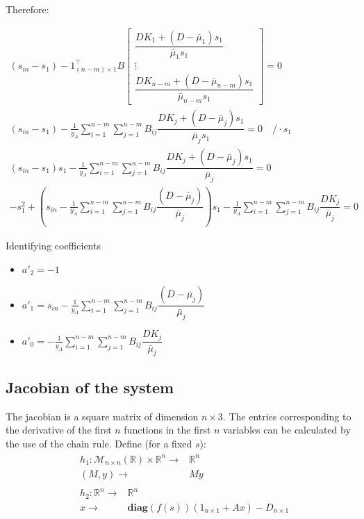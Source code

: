 \documentclass[3p,times]{elsarticle}
\newcommand{\R}{\mathbb{R}}
\newcommand{\diag}{\textbf{diag}}
\begin{document}
Therefore:

\begin{align}
(s_{in}-s_1)- 1_{(n-m)\times 1}^\top 
B\begin{bmatrix}
\dfrac{DK_1+(D-\bar{\mu}_1)s_1}{\bar{\mu}_{1}s_1} \\ \vdots \\ \dfrac{DK_{n-m}+(D-\bar{\mu}_{n-m})s_1}{\bar{\mu}_{n-m}s_1}
\end{bmatrix} = 0 \\
(s_{in}-s_1) -\frac{1}{y_A} \sum \limits_{i=1}^{n-m}\sum \limits_{j=1}^{n-m} B_{ij}\dfrac{DK_j+(D-\bar{\mu}_j)s_1}{\bar{\mu}_{j}s_1}  = 0 \quad /\cdot s_1 \\
(s_{in} - s_1)s_1   -\frac{1}{y_A} \sum \limits_{i=1}^{n-m}\sum \limits_{j=1}^{n-m} B_{ij}\dfrac{DK_j+(D-\bar{\mu}_j)s_1}{\bar{\mu}_{j}}  = 0 \\
-s_1^2 + \left( s_{in}-\frac{1}{y_A} \sum \limits_{i=1}^{n-m}\sum \limits_{j=1}^{n-m} B_{ij}\dfrac{(D-\bar{\mu}_j)}{\bar{\mu}_{j}} \right)s_1 - \frac{1}{y_A} \sum \limits_{i=1}^{n-m}\sum \limits_{j=1}^{n-m} B_{ij}\dfrac{DK_j}{\bar{\mu}_{j}} =0
\end{align} 

Identifying coefficients
\begin{itemize}
	\item $a'_2 = -1$
	\item $a'_1 = s_{in}-\frac{1}{y_A} \sum \limits_{i=1}^{n-m}\sum \limits_{j = 1}^{n-m} B_{ij}\dfrac{(D-\bar{\mu}_j)}{\bar{\mu}_{j}}$
	\item $a'_0 =- \frac{1}{y_A} \sum \limits_{i=1}^{n-m}\sum \limits_{j = 1}^{n-m} B_{ij}\dfrac{DK_j}{\bar{\mu}_{j}}$ 
\end{itemize}


\subsection{Jacobian of the system}
The jacobian is a square matrix of dimension $n\times 3$. The entries corresponding to the derivative of the first $n$ functions in the first $n$ variables can be calculated by the use of the chain rule. Define (for a fixed $s$):
\begin{align*} 
& \begin{array}{rc}
h_1:\mathcal{M}_{n \times n}(\R) \times \R^n \rightarrow & \R^n \\
(M,y) \rightarrow & My
\end{array}  \\
&\begin{array}{rl}
h_2: \R^n \rightarrow & \R^n \\
x \rightarrow & \diag(f(s))\left(1_{n\times 1}+ Ax\right)-D_{n\times 1}
\end{array} 	
\end{align*}
\end{document}
